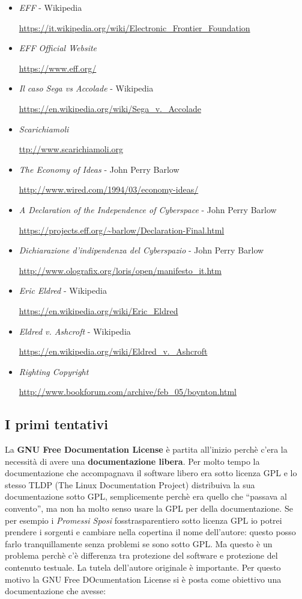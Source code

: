 \begin{itemize}
\item \textit{EFF} - Wikipedia 

\url{https://it.wikipedia.org/wiki/Electronic_Frontier_Foundation}
\item \textit{EFF Official Website}

 \url{https://www.eff.org/}
\item \textit{Il caso Sega vs Accolade} - Wikipedia 

\url{https://en.wikipedia.org/wiki/Sega_v._Accolade}
\item \textit{Scarichiamoli} 

\url{ttp://www.scarichiamoli.org}
\item \textit{The Economy of Ideas} - John Perry Barlow 

\url{http://www.wired.com/1994/03/economy-ideas/}
\item \textit{A Declaration of the Independence of Cyberspace} - John Perry Barlow 

\url{https://projects.eff.org/~barlow/Declaration-Final.html}
\item \textit{Dichiarazione d'indipendenza del Cyberspazio} - John Perry Barlow 

\url{http://www.olografix.org/loris/open/manifesto_it.htm}
\item \textit{Eric Eldred} -  Wikipedia

\url{https://en.wikipedia.org/wiki/Eric_Eldred}
\item \textit{Eldred v. Ashcroft} -  Wikipedia 

\url{https://en.wikipedia.org/wiki/Eldred_v._Ashcroft}
\item \textit{Righting Copyright} 

\url{http://www.bookforum.com/archive/feb_05/boynton.html}
\end{itemize}

\subsection{I primi tentativi}

La \textbf{GNU Free Documentation License} è partita all'inizio perchè c'era la necessità di avere una \textbf{documentazione libera}. Per molto tempo la documentazione che accompagnava il software libero era sotto licenza GPL e lo stesso TLDP (The Linux Documentation Project) distribuiva la sua documentazione sotto GPL, semplicemente perchè era quello che ``passava al convento'', ma non ha molto senso usare la GPL per della documentazione. Se per esempio i \textit{Promessi Sposi} fosstrasparentiero sotto licenza GPL io potrei prendere i sorgenti e cambiare nella copertina il nome dell'autore: questo posso farlo tranquillamente senza problemi se sono sotto GPL. Ma questo è un problema perchè c'è differenza tra protezione del software e protezione del contenuto testuale. La tutela dell'autore originale è importante. Per questo motivo la GNU Free DOcumentation License si è posta come obiettivo una documentazione che avesse:

